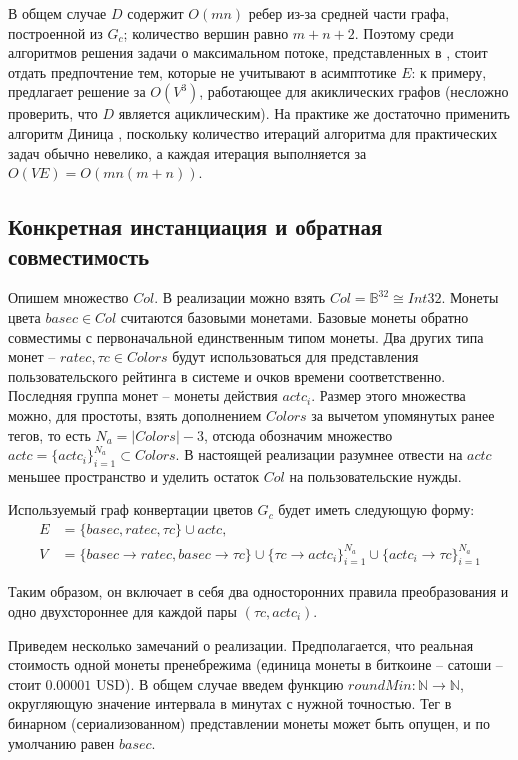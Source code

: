 \documentclass[specification,annotation]{itmo-student-thesis}
\begin{document}
В общем случае $D$ содержит $O(mn)$ ребер из-за средней части графа,
построенной из $G_c$; количество вершин равно $m+n+2$. Поэтому среди
алгоритмов решения задачи о максимальном потоке, представленных в
\cite{goldberg1988new}, стоит отдать предпочтение тем, которые не
учитывают в асимптотике $E$: к примеру, \cite{malhotra1978v}
предлагает решение за $O(V^3)$, работающее для акиклических графов
(несложно проверить, что $D$ является ациклическим). На практике же
достаточно применить алгоритм Диница \cite{dinitz2006dinitz},
поскольку количество итераций алгоритма для практических задач обычно
невелико, а каждая итерация выполняется за $O(VE) = O(mn(m+n))$.

\subsection{Конкретная инстанциация и обратная совместимость}

Опишем множество $Col$. В реализации можно взять $Col =
\mathbb{B}^{32} \cong Int32$. Монеты цвета $basec \in Col$ считаются
базовыми монетами. Базовые монеты обратно совместимы с первоначальной
единственным типом монеты. Два других типа монет -- $ratec, \tau c \in
Colors$ будут использоваться для представления пользовательского
рейтинга в системе и очков времени соответственно. Последняя группа
монет -- монеты действия $actc_i$. Размер этого множества можно, для
простоты, взять дополнением $Colors$ за вычетом упомянутых ранее
тегов, то есть $N_a = |Colors|-3$, отсюда обозначим множество $actc =
\{actc_i\}_{i=1}^{N_a} \subset Colors$. В настоящей реализации
разумнее отвести на $actc$ меньшее пространство и уделить остаток
$Col$ на пользовательские нужды.

Используемый граф конвертации цветов $G_c$ будет иметь следующую
форму:
\begin{align*}
  E &= \{basec, ratec, \tau c\} \cup actc,\\
  V &= \{basec \rightarrow ratec
  , basec \rightarrow \tau c\} \cup
  \{\tau c \rightarrow actc_i\}_{i=1}^{N_a} \cup
  \{actc_i \rightarrow \tau c\}_{i=1}^{N_a}
\end{align*}

Таким образом, он включает в себя два односторонних правила
преобразования и одно двухстороннее для каждой пары $(\tau c, actc_i)$.

Приведем несколько замечаний о реализации. Предполагается, что
реальная стоимость одной монеты пренебрежима (единица монеты в
биткоине -- сатоши -- стоит $0.00001$ USD). В общем случае введем
функцию $roundMin : \mathbb{N} \rightarrow \mathbb{N}$, округляющую
значение интервала в минутах с нужной точностью. Тег в бинарном
(сериализованном) представлении монеты может быть опущен, и по
умолчанию равен $basec$.
\end{document}
